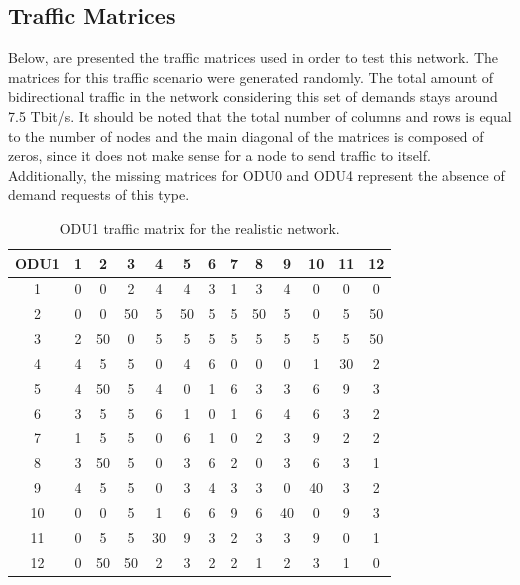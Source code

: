 \subsection{Traffic Matrices}
\label{referenceTraffic}
Below, are presented the traffic matrices used in order to test this network. The matrices for this traffic scenario were generated randomly. The total amount of bidirectional traffic in the network considering this set of demands stays around 7.5 Tbit/s. It should be noted that the total number of columns and rows is equal to the number of nodes and the main diagonal of the matrices is composed of zeros, since it does not make sense for a node to send traffic to itself. Additionally, the missing matrices for ODU0 and ODU4 represent the absence of demand requests of this type.  %
\vspace{11pt}

\begin{table}[H]
\centering
\begin{tabular}{|c|c|c|c|c|c|c|c|c|c|c|c|c|}
\hline
\textbf{ODU1} & 1 & 2 & 3 & 4 & 5 & 6 & 7 & 8 & 9 & 10 & 11 & 12 \\ \hline
1 & 0 & 0 & 2 & 4 & 4 & 3 & 1 & 3 & 4 & 0 & 0 & 0 \\ \hline
2 & 0 & 0 & 50 & 5 & 50 & 5 & 5 & 50 & 5 & 0 & 5 & 50 \\ \hline
3 & 2 & 50 & 0 & 5 & 5 & 5 & 5 & 5 & 5 & 5 & 5 & 50 \\ \hline
4 & 4 & 5 & 5 & 0 & 4 & 6 & 0 & 0 & 0 & 1 & 30 & 2 \\ \hline
5 & 4 & 50 & 5 & 4 & 0 & 1 & 6 & 3 & 3 & 6 & 9 & 3 \\ \hline
6 & 3 & 5 & 5 & 6 & 1 & 0 & 1 & 6 & 4 & 6 & 3 & 2 \\ \hline
7 & 1 & 5 & 5 & 0 & 6 & 1 & 0 & 2 & 3 & 9 & 2 & 2 \\ \hline
8 & 3 & 50 & 5 & 0 & 3 & 6 & 2 & 0 & 3 & 6 & 3 & 1 \\ \hline
9 & 4 & 5 & 5 & 0 & 3 & 4 & 3 & 3 & 0 & 40 & 3 & 2 \\ \hline
10 & 0 & 0 & 5 & 1 & 6 & 6 & 9 & 6 & 40 & 0 & 9 & 3 \\ \hline
11 & 0 & 5 & 5 & 30 & 9 & 3 & 2 & 3 & 3 & 9 & 0 & 1 \\ \hline
12 & 0 & 50 & 50 & 2 & 3 & 2 & 2 & 1 & 2 & 3 & 1 & 0 \\ \hline
\end{tabular}
\caption{ODU1 traffic matrix for the realistic network.}
\label{referenceODU1}
\end{table}


